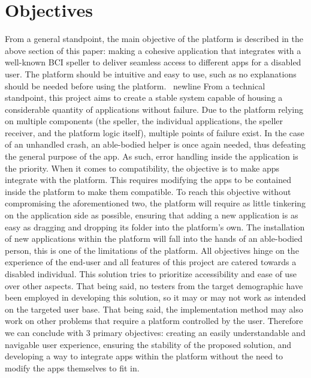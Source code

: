 \section{Objectives}\label{sect:objectives}
From a general standpoint, the main objective of the platform is described in the above section of this paper: making a cohesive application that integrates with a well-known BCI speller to deliver seamless access to different apps for a disabled user. The platform should be intuitive and easy to use, such as no explanations should be needed before using the platform. 
\vspace{\baselineskip}\ newline 
From a technical standpoint, this project aims to create a stable system capable of housing a considerable quantity of applications without failure. Due to the platform relying on multiple components (the speller, the individual applications, the speller receiver, and the platform logic itself), multiple points of failure exist. In the case of an unhandled crash, an able-bodied helper is once again needed, thus defeating the general purpose of the app. As such, error handling inside the application is the priority. 
\vspace{\baselineskip}\newline
When it comes to compatibility, the objective is to make apps integrate with the platform. This requires modifying the apps to be contained inside the platform to make them compatible. To reach this objective without compromising the aforementioned two, the platform will require as little tinkering on the application side as possible, ensuring that adding a new application is as easy as dragging and dropping its folder into the platform's own. The installation of new applications within the platform will fall into the hands of an able-bodied person, this is one of the limitations of the platform. 
\vspace{\baselineskip}\newline
All objectives hinge on the experience of the end-user and all features of this project are catered towards a disabled individual. This solution tries to prioritize accessibility and ease of use over other aspects. That being said, no testers from the target demographic have been employed in developing this solution, so it may or may not work as intended on the targeted user base. That being said, the implementation method may also work on other problems that require a platform controlled by the user.
\vspace{\baselineskip}\newline
Therefore we can conclude with 3 primary objectives: creating an easily understandable and navigable user experience, ensuring the stability of the proposed solution, and developing a way to integrate apps within the platform without the need to modify the apps themselves to fit in.



